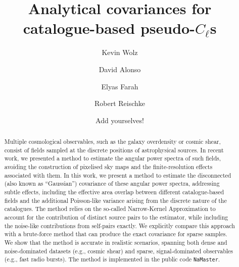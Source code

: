 \documentclass[aps,twocolumn, superscriptaddress, english, nofootinbib, 10pt]{revtex4-2}
\newcommand{\nmt}{{\tt NaMaster}\xspace}
\begin{document}
\title{Analytical covariances for catalogue-based pseudo-$C_\ell$s}

\author{Kevin Wolz}
\author{David Alonso}
\author{Elyas Farah}
\author{Robert Reischke}


\author{Add yourselves!}

\begin{abstract}
  Multiple cosmological observables, such as the galaxy overdensity or cosmic shear, consist of fields sampled at the discrete positions of astrophysical sources. In recent work, we presented a method to estimate the angular power spectra of such fields, avoiding the construction of pixelised sky maps and the finite-resolution effects associated with them. In this work, we present a method to estimate the disconnected (also known as ``Gaussian'') covariance of these angular power spectra, addressing subtle effects, including the effective area overlap between different catalogue-based fields and the additional Poisson-like variance arising from the discrete nature of the catalogues. The method relies on the so-called Narrow-Kernel Approximation to account for the contribution of distinct source pairs to the estimator, while including the noise-like contributions from self-pairs exactly. We explicitly compare this approach with a brute-force method that can produce the exact covariance for sparse samples. We show that the method is accurate in realistic scenarios, spanning both dense and noise-dominated datasets (e.g., cosmic shear) and sparse, signal-dominated observables (e.g., fast radio bursts). The method is implemented in the public code \nmt.
\end{abstract}

\maketitle
\end{document}
